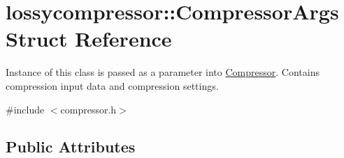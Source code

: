 \hypertarget{structlossycompressor_1_1_compressor_args}{}\section{lossycompressor\+:\+:Compressor\+Args Struct Reference}
\label{structlossycompressor_1_1_compressor_args}


Instance of this class is passed as a parameter into \hyperlink{classlossycompressor_1_1_compressor}{Compressor}. Contains compression input data and compression settings.  




{\ttfamily \#include $<$compressor.\+h$>$}

\subsection*{Public Attributes}
